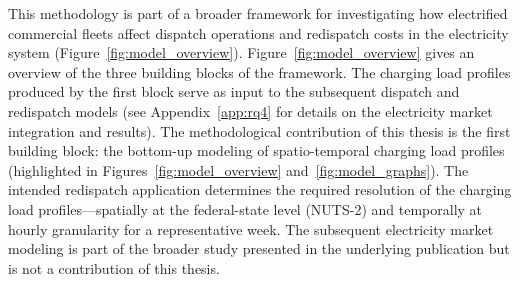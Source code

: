         This methodology is part of a broader framework for investigating how electrified commercial fleets affect dispatch operations and redispatch costs in the electricity system (Figure~\ref{fig:model_overview}). Figure~\ref{fig:model_overview} gives an overview of the three building blocks of the framework. The charging load profiles produced by the first block serve as input to the subsequent dispatch and redispatch models (see Appendix~\ref{app:rq4} for details on the electricity market integration and results).
        The methodological contribution of this thesis is the first building block: the bottom-up modeling of spatio-temporal charging load profiles (highlighted in Figures~\ref{fig:model_overview} and~\ref{fig:model_graphs}). The intended redispatch application determines the required resolution of the charging load profiles---spatially at the federal-state level (NUTS-2) and temporally at hourly granularity for a representative week. The subsequent electricity market modeling is part of the broader study presented in the underlying publication but is not a contribution of this thesis.

